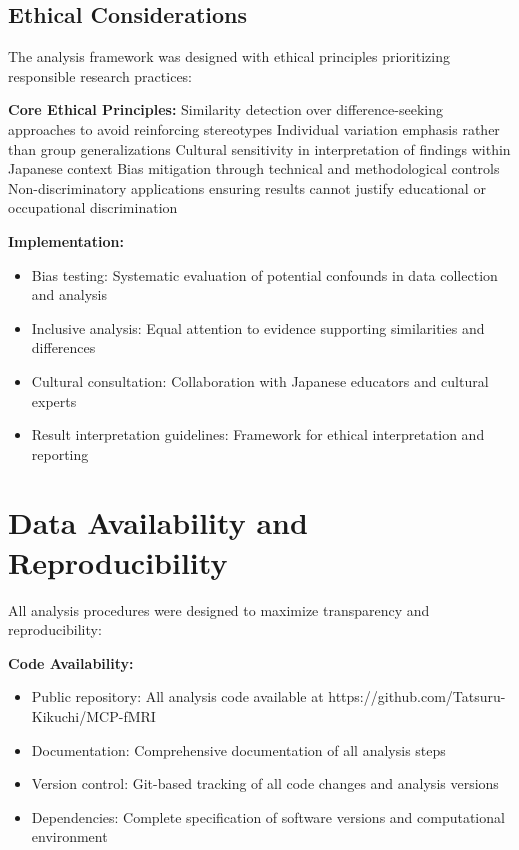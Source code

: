 \subsection{Ethical Considerations}
The analysis framework was designed with ethical principles prioritizing responsible research practices:

\vspace{0.5\baselineskip}
\noindent
\textbf{Core Ethical Principles:}
Similarity detection over difference-seeking approaches to avoid reinforcing stereotypes
Individual variation emphasis rather than group generalizations
Cultural sensitivity in interpretation of findings within Japanese context
Bias mitigation through technical and methodological controls
Non-discriminatory applications ensuring results cannot justify educational or occupational discrimination

\noindent
\textbf{Implementation:}
\begin{itemize}
\item Bias testing: Systematic evaluation of potential confounds in data collection and analysis
\item Inclusive analysis: Equal attention to evidence supporting similarities and differences
\item Cultural consultation: Collaboration with Japanese educators and cultural experts
\item Result interpretation guidelines: Framework for ethical interpretation and reporting
\end{itemize}


\section{Data Availability and Reproducibility}
All analysis procedures were designed to maximize transparency and reproducibility:

\vspace{0.5\baselineskip}
\noindent
\textbf{Code Availability:}
\begin{itemize}
\item Public repository: All analysis code available at https://github.com/Tatsuru-Kikuchi/MCP-fMRI
\item Documentation: Comprehensive documentation of all analysis steps
\item Version control: Git-based tracking of all code changes and analysis versions
\item Dependencies: Complete specification of software versions and computational environment
\end{itemize}

